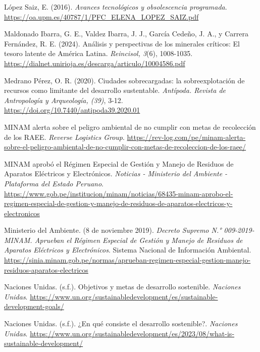 \documentclass[stu,12pt,a4paper]{apa7}
\begin{document}
\begin{list}{}{
    \setlength{\leftmargin}{1.27cm}
    \setlength{\itemindent}{-1.27cm}  
    \setlength{\parsep}{0pt}       
    \setlength{\itemsep}{0.8em}      
}
\item López Saiz, E. (2016). \textit{Avances tecnológicos y obsolescencia programada}. \url{https://oa.upm.es/40787/1/PFC_ELENA_LOPEZ_SAIZ.pdf}

\item Maldonado Ibarra, G. E., Valdez Ibarra, J. J., García Cedeño, J. A., y Carrera Fernández, R. E. (2024). Análisis y perspectivas de los minerales críticos: El tesoro latente de América Latina. \textit{Reincisol, 3}(6), 1008-1035. \url{https://dialnet.unirioja.es/descarga/articulo/10004586.pdf}

\item Medrano Pérez, O. R. (2020). Ciudades sobrecargadas: la sobreexplotación de recursos como limitante del desarrollo sustentable. \textit{Antípoda. Revista de Antropología y Arqueología, (39)}, 3-12. \url{https://doi.org/10.7440/antipoda39.2020.01}

\item MINAM alerta sobre el peligro ambiental de no cumplir con metas de recolección de los RAEE. \textit{Reverse Logistics Group}. \url{https://rev-log.com/pe/minam-alerta-sobre-el-peligro-ambiental-de-no-cumplir-con-metas-de-recoleccion-de-los-raee/}

\item MINAM aprobó el Régimen Especial de Gestión y Manejo de Residuos de Aparatos Eléctricos y Electrónicos. \textit{Noticias - Ministerio del Ambiente - Plataforma del Estado Peruano}. \url{https://www.gob.pe/institucion/minam/noticias/68435-minam-aprobo-el-regimen-especial-de-gestion-y-manejo-de-residuos-de-aparatos-electricos-y-electronicos}

\item Ministerio del Ambiente. (8 de noviembre 2019). \textit{Decreto Supremo N.° 009-2019-MINAM. Aprueban el Régimen Especial de Gestión y Manejo de Residuos de Aparatos Eléctricos y Electrónicos}. Sistema Nacional de Información Ambiental. \url{https://sinia.minam.gob.pe/normas/aprueban-regimen-especial-gestion-manejo-residuos-aparatos-electricos}

\item Naciones Unidas. (s.f.). Objetivos y metas de desarrollo sostenible. \textit{Naciones Unidas}. \url{https://www.un.org/sustainabledevelopment/es/sustainable-development-goals/}

\item Naciones Unidas. (s.f.). ¿En qué consiste el desarrollo sostenible?. \textit{Naciones Unidas}. \url{https://www.un.org/sustainabledevelopment/es/2023/08/what-is-sustainable-development/}


\end{list}
\end{document}
